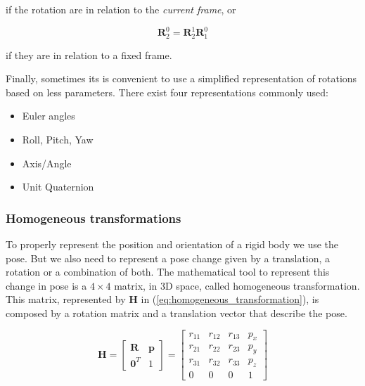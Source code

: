 if the rotation are in relation to the \emph{current frame}, or

\begin{equation}
    \boldsymbol{R}^{0}_{2} = \boldsymbol{R}^{1}_{2}\boldsymbol{R}^{0}_{1}
\end{equation}

if they are in relation to a fixed frame.

Finally, sometimes its is convenient to use a simplified representation of rotations based on less parameters. There exist four representations commonly used:

\begin{itemize}
    \item Euler angles
    \item Roll, Pitch, Yaw
    \item Axis/Angle
    \item Unit Quaternion
\end{itemize}


\subsubsection{Homogeneous transformations}
\label{subsubsec:homogeneous_transformations}

To properly represent the position and orientation of a rigid body we use the pose. But we also need to represent a pose change given by a translation, a rotation or a combination of both. The mathematical tool to represent this change in pose is a $4\times4$ matrix, in 3D space, called homogeneous transformation. This matrix, represented by $\boldsymbol{H}$ in (\ref{eq:homogeneous_transformation}), is composed by a rotation matrix and a translation vector that describe the pose.

\begin{equation}
    \label{eq:homogeneous_transformation}
    \boldsymbol{H} = \begin{bmatrix} \boldsymbol{R} & \boldsymbol{p} \\ 
    \boldsymbol{0}^{T} & 1\end{bmatrix} = \begin{bmatrix} r_{11} & r_{12} & r_{13} & p_x\\
    r_{21} & r_{22} & r_{23} & p_y\\
    r_{31} & r_{32} & r_{33} & p_z\\
    0 & 0 & 0 & 1\end{bmatrix}
\end{equation}

